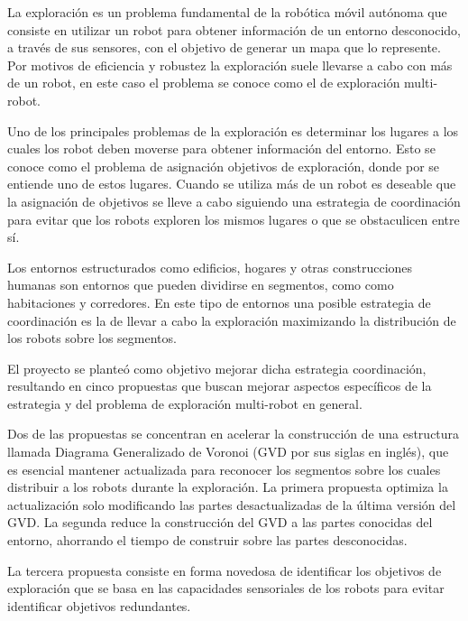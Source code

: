 La exploración es un problema fundamental de la robótica móvil autónoma que
consiste en utilizar un robot para obtener información de un entorno
desconocido, a través de sus sensores, con el objetivo de generar un mapa que lo
represente. Por motivos de eficiencia y robustez la exploración suele llevarse
a cabo con más de un robot, en este caso el problema se conoce como el de
exploración multi-robot.

Uno de los principales problemas de la exploración es determinar los lugares a
los cuales los robot deben moverse para obtener información del entorno. Esto
se conoce como el problema de asignación objetivos de exploración, donde por
 se entiende uno de estos lugares. Cuando se
utiliza más de un robot es deseable que la asignación de objetivos se lleve
a cabo siguiendo una estrategia de coordinación para evitar que los robots
exploren los mismos lugares o que se obstaculicen entre sí.

Los entornos estructurados como edificios, hogares y otras construcciones
humanas son entornos que pueden dividirse en segmentos, como como habitaciones
y corredores. En este tipo de entornos una posible estrategia de coordinación
es la de llevar a cabo la exploración maximizando la distribución de los
robots sobre los segmentos. 

El proyecto se planteó como objetivo mejorar dicha estrategia coordinación,
resultando en cinco propuestas que buscan mejorar aspectos específicos de la
estrategia y del problema de exploración multi-robot en general.

Dos de las propuestas se concentran en acelerar la construcción de una
estructura llamada Diagrama Generalizado de Voronoi (GVD por sus siglas en
inglés), que es esencial mantener actualizada para reconocer los segmentos
sobre los cuales distribuir a los robots durante la exploración. La primera
propuesta optimiza la actualización solo modificando las partes desactualizadas 
de la última versión del GVD. La segunda reduce la construcción del GVD a las
partes conocidas del entorno, ahorrando el tiempo de construir sobre las
partes desconocidas.

La tercera propuesta consiste en  forma novedosa de identificar los objetivos de exploración
que se basa en las capacidades sensoriales de los robots para evitar
identificar objetivos redundantes.

